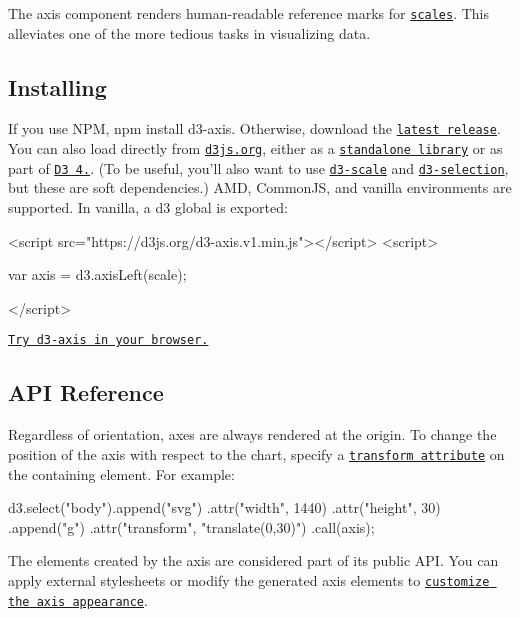 The axis component renders human-\/readable reference marks for \href{https://github.com/d3/d3-scale}{\tt scales}. This alleviates one of the more tedious tasks in visualizing data.

\subsection*{Installing}

If you use N\+PM, {\ttfamily npm install d3-\/axis}. Otherwise, download the \href{https://github.com/d3/d3-axis/releases/latest}{\tt latest release}. You can also load directly from \href{https://d3js.org}{\tt d3js.\+org}, either as a \href{https://d3js.org/d3-axis.v1.min.js}{\tt standalone library} or as part of \href{https://github.com/d3/d3}{\tt D3 4.}. (To be useful, you’ll also want to use \href{https://github.com/d3/d3-scale}{\tt d3-\/scale} and \href{https://github.com/d3/d3-selection}{\tt d3-\/selection}, but these are soft dependencies.) A\+MD, Common\+JS, and vanilla environments are supported. In vanilla, a {\ttfamily d3} global is exported\+:


\begin{DoxyCode}
<script src="https://d3js.org/d3-axis.v1.min.js"></script>
<script>

var axis = d3.axisLeft(scale);

</script>
\end{DoxyCode}


\href{https://tonicdev.com/npm/d3-axis}{\tt Try d3-\/axis in your browser.}

\subsection*{A\+PI Reference}

Regardless of orientation, axes are always rendered at the origin. To change the position of the axis with respect to the chart, specify a \href{http://www.w3.org/TR/SVG/coords.html#TransformAttribute}{\tt transform attribute} on the containing element. For example\+:


\begin{DoxyCode}
d3.select("body").append("svg")
    .attr("width", 1440)
    .attr("height", 30)
  .append("g")
    .attr("transform", "translate(0,30)")
    .call(axis);
\end{DoxyCode}


The elements created by the axis are considered part of its public A\+PI. You can apply external stylesheets or modify the generated axis elements to \href{https://bl.ocks.org/mbostock/3371592}{\tt customize the axis appearance}.

